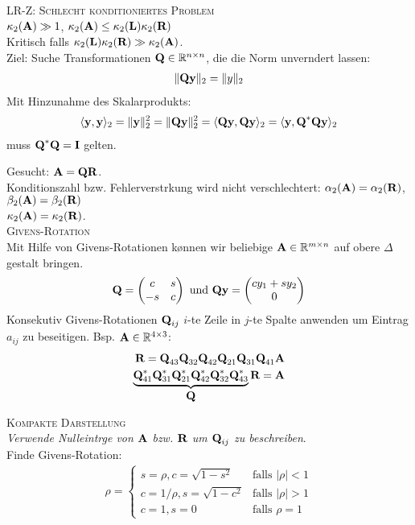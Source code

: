 \textsc{LR-Z: Schlecht konditioniertes Problem}\\
$\kappa_2(\mbox{\bf A}) \gg 1$, $\kappa_2(\mbox{\bf A}) \leq \kappa_2(\mbox{\bf L})\kappa_2(\mbox{\bf R})$\\
Kritisch falls $\kappa_2(\mbox{\bf L})\kappa_2(\mbox{\bf R}) \gg \kappa_2(\mbox{\bf A})$.\\

Ziel: Suche Transformationen $\mbox{\bf Q} \in \mathbb{R}^{n \times n}$, die die Norm unver\a ndert lassen:
\begin{align*}
\Vert \mbox{\bf Qy} \Vert_2 = \Vert y \Vert_2
\end{align*}
Mit Hinzunahme des Skalarprodukts:
\begin{align*}
\langle \mbox{\bf y}, \mbox{\bf y} \rangle_2 = \Vert \mbox{\bf y} \Vert_2^2 = \Vert \mbox{\bf Qy} \Vert_2^2 = \langle \mbox{\bf Qy}, \mbox{\bf Qy} \rangle_2 = \langle \mbox{\bf y}, \mbox{\bf Q}^*\mbox{\bf Qy} \rangle_2
\end{align*}
muss $\mbox{\bf Q}^*\mbox{\bf Q} = \mbox{\bf I}$ gelten.

Gesucht: $\mbox{\bf A}=\mbox{\bf QR}$.\\
Konditionszahl bzw. Fehlerverst\a rkung wird nicht verschlechtert: $\alpha_2(\mbox{\bf A}) = \alpha_2(\mbox{\bf R})$, $\beta_2(\mbox{\bf A}) = \beta_2(\mbox{\bf R})$\\
$\kappa_2(\mbox{\bf A})= \kappa_2(\mbox{\bf R})$.\\

\textsc{Givens-Rotation}\\
Mit Hilfe von Givens-Rotationen k\o nnen wir beliebige $\mbox{\bf A}\in \mathbb{R}^{m \times n}$ auf obere $\Delta$gestalt bringen.
\begin{align*}
\mbox{\bf Q}=\begin{pmatrix}
c & s \\
-s & c
\end{pmatrix}
\text{ und }
\mbox{\bf Qy} = \begin{pmatrix}
cy_1 + sy_2 \\ 0
\end{pmatrix}
\end{align*}
Konsekutiv Givens-Rotationen $\mbox{\bf Q}_{ij}$ $i$-te Zeile in $j$-te Spalte anwenden um Eintrag $a_{ij}$ zu beseitigen. Bsp. $\mbox{\bf A} \in \mathbb{R}^{4 \times 3}$:
\begin{align*}
\mbox{\bf R} = \mbox{\bf Q}_{43}\mbox{\bf Q}_{32}\mbox{\bf Q}_{42}\mbox{\bf Q}_{21}\mbox{\bf Q}_{31}\mbox{\bf Q}_{41}\mbox{\bf A} \\
\underbrace{\mbox{\bf Q}_{41}^*\mbox{\bf Q}_{31}^*\mbox{\bf Q}_{21}^*\mbox{\bf Q}_{42}^*\mbox{\bf Q}_{32}^*\mbox{\bf Q}_{43}^*}_{\mbox{\bf Q}}\mbox{\bf R}=\mbox{\bf A}
\end{align*}

\textsc{Kompakte Darstellung}\\
\emph{Verwende Nulleintr\a ge von $\mbox{\bf A}$ bzw. $\mbox{\bf R}$ um $\mbox{\bf Q}_{ij}$ zu beschreiben}.\\
Finde Givens-Rotation:
\begin{align*}
\rho = 
\begin{cases}
s = \rho, c=\sqrt{1-s^2}  &\text{falls $|\rho|<1$} \\
c = 1/\rho, s=\sqrt{1-c^2} &\text{falls $|\rho|>1$} \\
c = 1, s=0 &\text{falls $\rho=1$}
\end{cases}
\end{align*}

